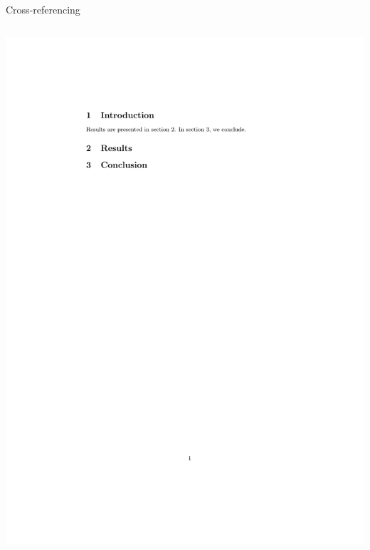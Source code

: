 \documentclass[,aspectratio=43]{beamer}
\begin{document}
\begin{frame}[fragile]{Cross-referencing}
\begin{columns}[T]
\begin{column}{0.43\textwidth}
\begin{center}\includegraphics[width=1\linewidth]{figure/crossref} \end{center}
\end{column}
\end{columns}
\end{frame}
\end{document}
